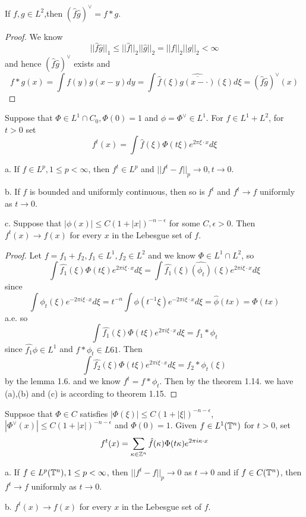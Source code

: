 \begin{lemma}
    If $f,g\in L^2$,then $(\hat{f}\hat{g})^{\vee} = f*g$. 
\end{lemma}
\begin{proof}
    We know
    \[
    ||\hat{f}\hat{g}||_1 \leq ||\hat{f}||_2||\hat{g}||_2 = ||f||_2||g||_2 < \infty
    \]
    and hence $(\hat{f}\hat{g})^{\vee}$ exists and
    \[
    f*g(x) = \int f(y)g(x-y)dy = \int\hat{f}(\xi)\widehat{\overline{g(x-\cdot)}}(\xi) d\xi = (\hat{f}\hat{g})^{\vee}(x)
    \]
\end{proof}

\begin{theorem}
    Suppose that $\Phi \in L^1\cap C_0, \Phi(0) = 1$ and $\phi = \Phi^{\vee}\in L^1$. For $f\in L^1+L^2$, for $t>0$ set
    \[
    f^t(x) = \int \hat{f}(\xi)\Phi(t\xi)e^{2\pi \xi \cdot x}d\xi
    \]\par
    a. If $f\in L^p, 1\leq p < \infty$, then $f^t\in L^p$ and $||f^t - f||_p \to 0, t\to 0$.\par
    b. If $f$ is bounded and uniformly continuous, then so is $f^t$ and $f^t\to f$ uniformly as $t\to 0$.\par
    c. Suppose that $|\phi(x)|\leq C(1+|x|)^{-n-\epsilon}$ for some $C,\epsilon > 0$. Then $f^t(x)\to f(x)$ for every $x$ in the Lebesgue set of $f$.
\end{theorem}
\begin{proof}\par
    Let $f=f_1+f_2, f_1\in L^1,f_2\in L^2$ and we know $\Phi\in L^1\cap L^2$, so
    \[
    \int \hat{f_1}(\xi)\Phi(t\xi)e^{2\pi i \xi\cdot x}d\xi =  \int \hat{f_1}(\xi)\widehat{(\phi_t)}(\xi)e^{2\pi i \xi\cdot x}d\xi
    \]
    since
    \[
    \int \phi_t(\xi)e^{-2\pi i \xi \cdot x}d\xi = t^{-n}\int \phi(t^{-1}\xi)e^{-2\pi i \xi \cdot x}d\xi = \hat{\phi}(tx) = \Phi(tx)
    \]
    a.e. so
    \[
     \int \hat{f_1}(\xi)\Phi(t\xi)e^{2\pi i \xi\cdot x}d\xi = f_1*\phi_t
    \]
    since $\hat{f_1}\phi\in L^1$ and $f*\phi_t \in L61$. Then
    \[
     \int \hat{f_2}(\xi)\Phi(t\xi)e^{2\pi i \xi\cdot x}d\xi = f_2*\phi_t(\xi)
    \]
    by the lemma 1.6. and we know $f^t = f*\phi_t$. Then by the theorem 1.14. we have (a),(b) and (c) is according to theorem 1.15.
\end{proof}

\begin{theorem}
    Suppsoe that $\Phi \in C$ satisfies $|\Phi(\xi)| \leq C(1+|\xi|)^{-n-\epsilon}$, $|\Phi^{\vee}(x)| \leq C(1+|x|)^{-n-\epsilon}$ and $\Phi(0) = 1$. Given $f\in L^1(\mathbb{T}^n)$ for $t>0$, set
    \[
    f^t(x) = \sum\limits_{\kappa\in\mathbb{Z}^n}\hat{f}(\kappa)\Phi(t\kappa)e^{2\pi i \kappa\cdot x}
    \]\par
    a. If $f\in L^p(\mathbb{T}^n), 1\leq p <\infty$, then $||f^t - f||_p \to 0$ as $t\to 0$ and if $f\in C(\mathbb{T}^n)$, then $f^t \to f$ uniformly as $t\to 0$.\par
    b. $f^t(x)\to f(x)$ for every $x$ in the Lebesgue set of $f$.
\end{theorem}

